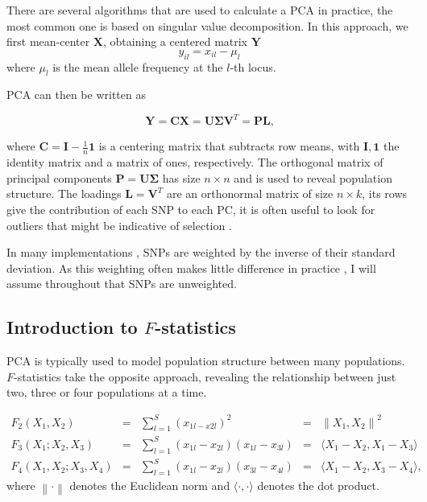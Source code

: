 \documentclass[12pt,a4pape, fullpage]{article}
\newcommand{\norm}[1]{\left\lVert#1\right\rVert}
\newcommand{\normsq}[1]{\left\lVert#1\right\rVert^2}
\newcommand{\MX}{\mathbf{X}} %
\newcommand{\MC}{\mathbf{C}} %
\newcommand{\MY}{\mathbf{Y}} %
\newcommand{\MP}{\mathbf{P}} %
\newcommand{\ML}{\mathbf{L}} %
\newcommand{\MSINGULAR}{\mathbf{\Sigma}} %
\begin{document}
There are several algorithms that are used to calculate a PCA in practice,
   the most common one is based on singular value decomposition. In this approach, we first mean-center $\MX$, obtaining a centered matrix $\MY$
	\begin{equation*}
	y_{il} = x_{il} - \mu_l
	\end{equation*}
	where $\mu_l$ is the mean allele frequency at the $l$-th locus.
	
	PCA can then be written as
	
	\begin{equation}
	\MY = \MC\MX = \mathbf{U} \MSINGULAR \mathbf{V}^T = \MP\ML\text{,}
	\end{equation}
	
	where $\MC = \mathbf{I} -\frac{1}{n}\mathbf{1}$ is a centering matrix that subtracts row means, with $\mathbf{I}, \mathbf{1}$  the identity matrix and a matrix of ones, respectively. The orthogonal matrix of principal components $\MP=\mathbf{U}\MSINGULAR$ has size $n \times n$ and is used to reveal population structure. The loadings $\ML=\mathbf{V}^T$ are an orthonormal matrix of size $n \times k$, its rows give the contribution of each SNP to each PC, it is often useful to look for outliers that might be indicative of selection \cite[e.g][]{francois2010}.
	
	In many  implementations \citep[e.g]{patterson2006}, SNPs are weighted by
    the inverse of their standard deviation. As this weighting often makes little
    difference in practice \citep{mcvean2009}, I will assume throughout that SNPs
    are unweighted.

\subsection{Introduction to $F$-statistics}
PCA is typically used to model population structure between many populations. $F$-statistics take the opposite approach, revealing the relationship between just two,  three or four populations at a time. 

\begin{subequations}
	\begin{align}
	F_2(X_1, X_2) &=& \sum_{l=1}^S(x_{1l - x{2l}})^2 &=& \normsq{X_1, X_2}\\
	F_3(X_1; X_2, X_3) &=& \sum_{l=1}^S(x_{1l} - x_{2l})(x_{1l} - x_{3l}) &=& \langle X_1 - X_2, X_1 - X_3 \rangle\\	
	F_4(X_1, X_2; X_3, X_4) &=& \sum_{l=1}^S(x_{1l} - x_{2l})(x_{3l} - x_{4l}) &=& \langle X_1 - X_2, X_3 - X_4 \rangle	\text{,}
	\end{align}
\end{subequations}
where $\norm{\cdot}$ denotes the Euclidean norm and $\langle \cdot, \cdot \rangle$ denotes the dot product.
\end{document}
